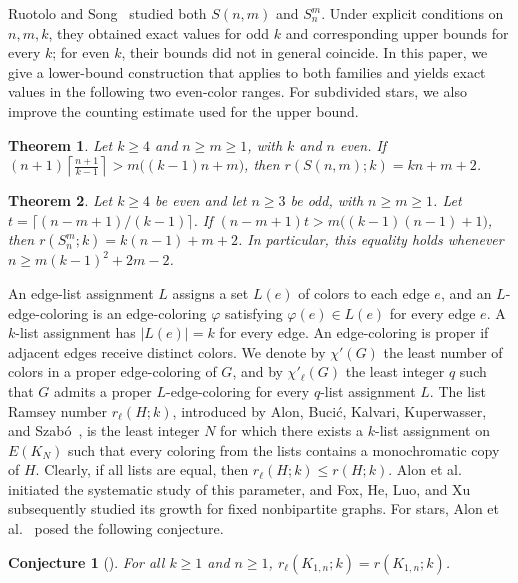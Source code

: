 \documentclass[11pt]{article}
\newtheorem{theorem}{Theorem}[section]
\newtheorem*{conjecture}{Conjecture}
\theoremstyle{definition}
\theoremstyle{remark}
\begin{document}
Ruotolo and Song~\cite{RuotoloSong} studied both \(S(n,m)\) and
\(S_n^m\). Under explicit conditions on \(n,m,k\), they obtained
exact values for odd \(k\) and corresponding upper bounds for
every \(k\); for even \(k\), their bounds did not in general
coincide. In this paper, we give a lower-bound construction that applies to both
families and yields exact values in the following two even-color
ranges. For subdivided stars, we also improve the counting estimate
used for the upper bound.

\begin{theorem}
\label{thm:double-star}
Let \(k\ge4\) and \(n\ge m\ge1\), with \(k\) and \(n\) even. If $(n+1)\left\lceil\frac{n+1}{k-1}\right\rceil
 >m\bigl((k-1)n+m\bigr)$, then \(r(S(n,m);k)=kn+m+2\).
\end{theorem}

\begin{theorem}
\label{thm:subdivided-star}
Let \(k\ge4\) be even and let \(n\ge3\) be odd, with \(n\ge m\ge1\).
Let \(t=\lceil(n-m+1)/(k-1)\rceil\). If
\((n-m+1)t>m\bigl((k-1)(n-1)+1\bigr)\), then
\(r(S_n^m;k)=k(n-1)+m+2\). In particular, this equality holds
whenever \(n\ge m(k-1)^2+2m-2\).
\end{theorem}

An edge-list assignment \(L\)
assigns a set \(L(e)\) of colors to each edge \(e\), and an
\(L\)-edge-coloring is an edge-coloring \(\varphi\) satisfying
\(\varphi(e)\in L(e)\) for every edge \(e\). A \(k\)-list assignment
has \(|L(e)|=k\) for every edge. An edge-coloring is proper if adjacent edges receive distinct colors.
We denote by \(\chi'(G)\) the least number of colors in a proper
edge-coloring of \(G\), and by \(\chi'_{\ell}(G)\) the least integer
\(q\) such that \(G\) admits a proper \(L\)-edge-coloring for every
\(q\)-list assignment \(L\). The list Ramsey number
\(r_\ell(H;k)\), introduced by Alon, Buci\'c, Kalvari, Kuperwasser,
and Szab\'o~\cite{AlonEtAl}, is the least integer \(N\) for which
there exists a \(k\)-list assignment on \(E(K_N)\) such that every
coloring from the lists contains a monochromatic copy of \(H\).
Clearly, if all lists are equal, then \(r_\ell(H;k)\le r(H;k)\). Alon et al.~\cite{AlonEtAl}
initiated the systematic study of this parameter, and Fox, He, Luo,
and Xu~\cite{FoxEtAl} subsequently studied its growth for fixed
nonbipartite graphs. For stars, Alon et al.~\cite{AlonEtAl} posed the following
conjecture.

\begin{conjecture}[\cite{AlonEtAl}]
For all \(k\ge1\) and \(n\ge1\), \(r_\ell(K_{1,n};k)=r(K_{1,n};k)\).
\end{conjecture}
\end{document}
